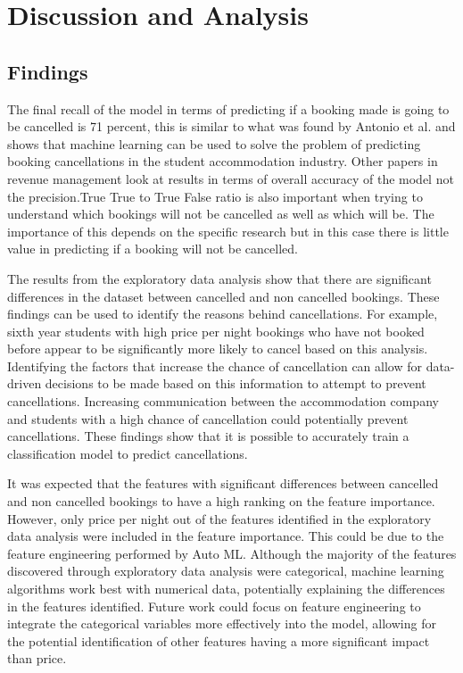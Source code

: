 \chapter{Discussion and Analysis}

\section{Findings}
The final recall of the model in terms of predicting if a booking made is going to be cancelled is 71 percent, this is similar to what was found by Antonio et al.  and shows that machine learning can be used to solve the problem of predicting booking cancellations in the student accommodation industry. Other papers in revenue management look at results in terms of overall accuracy \cite{Antonio2017PredictingRevenue} of the model not the precision.True True to True False ratio is also important when trying to understand which bookings will not be cancelled as well as which will be. The importance of this depends on the specific research but in this case there is little value in predicting if a booking will not be cancelled.

\vspace{5mm}

The results from the exploratory data analysis show that there are significant differences in the dataset between cancelled and non cancelled bookings. These findings can be used to identify the reasons behind cancellations. For example, sixth year students with high price per night bookings who have not booked before appear to be significantly more likely to cancel based on this analysis. Identifying the factors that increase the chance of cancellation can allow for data-driven decisions to be made based on this information to attempt to prevent cancellations. Increasing communication between the accommodation company and students with a high chance of cancellation could potentially prevent cancellations. These findings show that it is possible to accurately train a classification model to predict cancellations. 

\vspace{5mm}

It was expected that the features with significant differences between cancelled and non cancelled bookings to have a high ranking on the feature importance. However, only price per night out of the features identified in the exploratory data analysis were included in the feature importance. This could be due to the feature engineering performed by Auto ML. Although the majority of the features discovered through exploratory data analysis were categorical, machine learning algorithms work best with numerical data, potentially explaining the differences in the features identified. Future work could focus on feature engineering to integrate the categorical variables more effectively into the model, allowing for the potential identification of other features having a more significant impact than price. 

